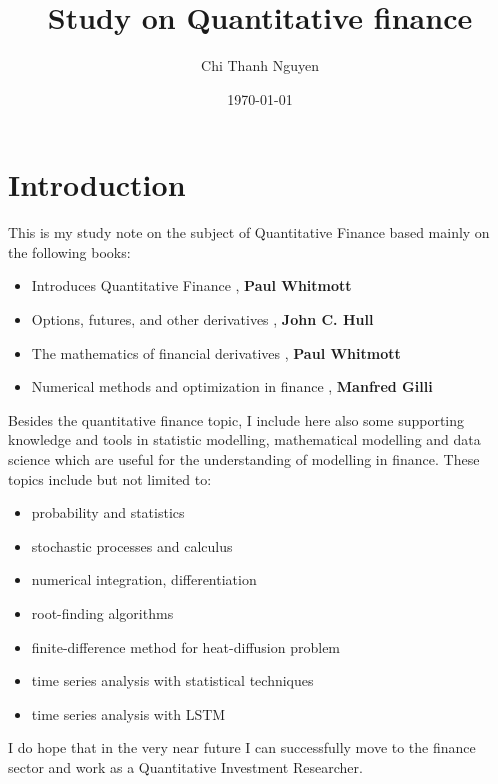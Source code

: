 \documentclass[11pt,a4paper]{report}
\begin{document}
\title{Study on Quantitative finance}
\author{Chi Thanh Nguyen}
\date{\today \@ \currenttime}
\maketitle

\tableofcontents


\chapter{Introduction}
This is my study note on the subject of Quantitative Finance based mainly on the following books:
\begin{itemize}
	\setlength\itemsep{0em}
	\item Introduces Quantitative Finance \cite{pw_iqf2ed_2007}, \textbf{Paul Whitmott}
	\item Options, futures, and other derivatives \cite{ch_ofd9ed_2015}, \textbf{John C. Hull}
	\item The mathematics of financial derivatives \cite{pw_mathfinderiv_1995}, \textbf{Paul Whitmott}
	\item Numerical methods and optimization in finance \cite{mg_nmof_2019}, \textbf{Manfred Gilli}  	
\end{itemize}

Besides the quantitative finance topic, I include here also some supporting knowledge and tools in statistic modelling, mathematical modelling and data science which are useful for the understanding of modelling in finance. These topics include but not limited to:

\begin{itemize}
	\setlength\itemsep{0em}
	\item probability and statistics
	\item stochastic processes and calculus
	\item numerical integration, differentiation
	\item root-finding algorithms
	\item finite-difference method for heat-diffusion problem
	\item time series analysis with statistical techniques
	\item time series analysis with LSTM
\end{itemize}

I do hope that in the very near future I can successfully move to the finance sector and work as a Quantitative Investment Researcher. 


\appendix 
%
%
%
%
%
%



\printindex



\end{document}
